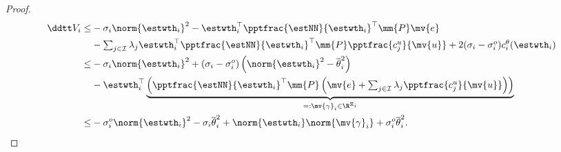 \documentclass[letterpaper, journal]{IEEEtran}
\providecommand{\DIFaddbegin}{} %
\providecommand{\DIFaddend}{} %
\providecommand{\DIFdelend}{} %
\begin{document}
\begin{proof}
\DIFdelend \DIFaddbegin \begin{align} \label{eq:Vi:dot:1} 
  \ddtt V_i
  \le&
    -\sigma_i \norm{\estwth_i}^2
    -
    \estwth_i^\top
    {\pptfrac{\estNN}{\estwth_i}}^\top
    \mm{P}
    \mv{e}
  \\ \nonumber
  &
    -
    \textstyle\sum_{j\in\mathcal{I}}
    \lambda_j 
    \estwth_i^\top
    {\pptfrac{\estNN}{\estwth_i}}^\top
    \mm{P}
    \pptfrac{c^{u}_{j}}{\mv{u}}
    +
    2(\sigma_i-\sigma_i^o) c_i^{\theta}(\estwth_i)
  \\ \nonumber
  \le&
    -\sigma_i \norm{\estwth_i}^2
    +
    (\sigma_i-\sigma_i^o) 
    \left(
      \norm{\estwth_i}^2
      -
      \overline{\theta}_i^2
    \right)
  \\ \nonumber
  &
    -
    \estwth_i^\top
    \underbrace{
    \left(
      {\pptfrac{\estNN}{\estwth_i}}^\top
      \mm{P}
      \left(
        \mv{e}
        +
        \textstyle\sum_{j\in\mathcal{I}}
        \lambda_j 
        \pptfrac{c^{u}_{j}}{\mv{u}}
      \right)
    \right)
    }_{=: \mv{\gamma}_i\in\R^{\Xi_i}}
  \\ \nonumber
  \le&
    -\sigma_i^o \norm{\estwth_i}^2
    -\sigma_i \overline{\theta}_i^2
    +
    \norm{\estwth_i}
    \norm{\mv{\gamma}_i}
    +
    \sigma_i^o \overline{\theta}_i^2
  .
\end{align}\DIFaddend 


\end{proof}
\end{document}
